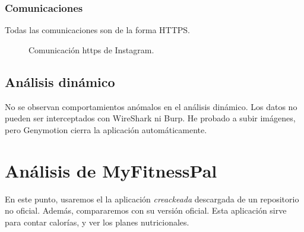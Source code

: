 \documentclass[12pt,twoside]{article}
\begin{document}
\subsubsection{Comunicaciones}
Todas las comunicaciones son de la forma HTTPS.
\begin{figure}[H]
    \centering
    \caption{Comunicación https de Instagram.}
\end{figure}
\subsection{Análisis dinámico}
No se observan comportamientos anómalos en el análisis dinámico. Los datos no pueden ser interceptados con WireShark ni Burp. He probado a subir imágenes, pero Genymotion cierra la aplicación automáticamente. 

\newpage
\section{Análisis de MyFitnessPal}
En este punto, usaremos el la aplicación \textit{creackeada} descargada de un repositorio no oficial. Además, compararemos con su versión oficial. Esta aplicación sirve para contar calorías, y ver los planes nutricionales.
\end{document}
